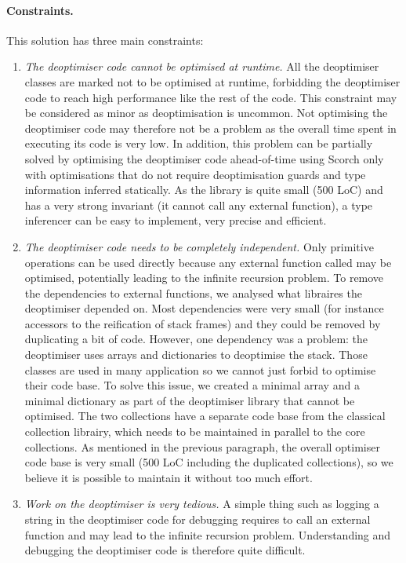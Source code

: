 \documentclass[a4paper,12pt,twoside]{../includes/ThesisStyle}
\begin{document}
\paragraph{Constraints.} This solution has three main constraints:
\begin{enumerate}
	\item \emph{The deoptimiser code cannot be optimised at runtime.} All the deoptimiser classes are marked not to be optimised at runtime, forbidding the deoptimiser code to reach high performance like the rest of the code. This constraint may be considered as minor as deoptimisation is uncommon. Not optimising the deoptimiser code may therefore not be a problem as the overall time spent in executing its code is very low. In addition, this problem can be partially solved by optimising the deoptimiser code ahead-of-time using Scorch only with optimisations that do not require deoptimisation guards and type information inferred statically. As the library is quite small (500 LoC) and has a very strong invariant (it cannot call any external function), a type inferencer can be easy to implement, very precise and efficient.
	\item \emph{The deoptimiser code needs to be completely independent.} Only primitive operations can be used directly because any external function called may be optimised, potentially leading to the infinite recursion problem. To remove the dependencies to external functions, we analysed what libraires the deoptimiser depended on. Most dependencies were very small (for instance accessors to the reification of stack frames) and they could be removed by duplicating a bit of code. However, one dependency was a problem: the deoptimiser uses arrays and dictionaries to deoptimise the stack. Those classes are used in many application so we cannot just forbid to optimise their code base. To solve this issue, we created a minimal array and a minimal dictionary as part of the deoptimiser library that cannot be optimised. The two collections have a separate code base from the classical collection librairy, which needs to be maintained in parallel to the core collections. As mentioned in the previous paragraph, the overall optimiser code base is very small (500 LoC including the duplicated collections), so we believe it is possible to maintain it without too much effort.
	\item \emph{Work on the deoptimiser is very tedious.} A simple thing such as logging a string in the deoptimiser code for debugging requires to call an external function and may lead to the infinite recursion problem. Understanding and debugging the deoptimiser code is therefore quite difficult.
\end{enumerate}
\end{document}
